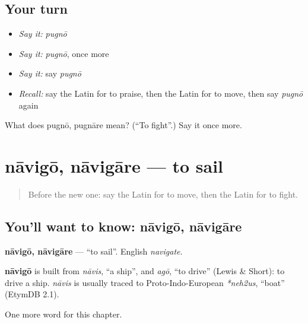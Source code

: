 \subsection*{Your turn}
\begin{itemize}
\raggedright
  \item \emph{Say it:} \emph{pugnō}
  \item \emph{Say it:} \emph{pugnō}, once more
  \item \emph{Say it:} say \emph{pugnō}
  \item \emph{Recall:} say the Latin for to praise, then the Latin for to move, then say \emph{pugnō} again
\end{itemize}

\begin{tcolorbox}[breakable,colback=teal!4,colframe=teal!35!black,title={Before you move on}]
What does pugnō, pugnāre mean? (\textquotedblleft{}To fight\textquotedblright{}.) Say it once more.
\end{tcolorbox}
\section[nāvigō, nāvigāre]{nāvigō, nāvigāre — to sail}

\label{lesson:LA-C100-navigo}



\begin{quote}
Before the new one: say the Latin for to move, then the Latin for to fight.
\end{quote}

\subsection*{You'll want to know: nāvigō, nāvigāre}
\textbf{nāvigō, nāvigāre} — \textquotedblleft{}to sail\textquotedblright{}. English \emph{navigate}.

\begin{cousinweb}
\textbf{nāvigō} is built from \emph{nāvis}, \textquotedblleft{}a ship\textquotedblright{}, and \emph{agō}, \textquotedblleft{}to drive\textquotedblright{} (Lewis \& Short): to drive a ship. \emph{nāvis} is usually traced to Proto-Indo-European \emph{*neh2us}, \textquotedblleft{}boat\textquotedblright{} (EtymDB 2.1).
\end{cousinweb}

\begin{grammarlens}[title={What you've built}]
One more word for this chapter.
\end{grammarlens}

